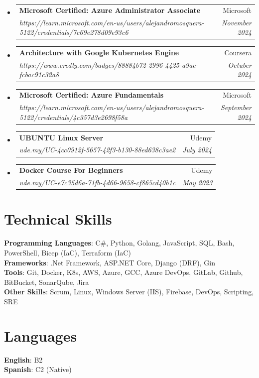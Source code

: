 \documentclass[letterpaper,11pt]{article}
\makeatletter
\newcommand{\resumeSubheading}[4]{
  \vspace{-2pt}\item
    \begin{tabular*}{0.97\textwidth}[t]{l@{\extracolsep{\fill}}r}
      \textbf{#1} & #2 \\
      \textit{\small#3} & \textit{\small #4} \\
    \end{tabular*}\vspace{-7pt}
}
\newcommand{\resumeSubHeadingListStart}{\begin{itemize}[leftmargin=0.15in, label={}]}
\newcommand{\resumeSubHeadingListEnd}{\end{itemize}}
\makeatother
\begin{document}
  \resumeSubHeadingListStart
    \resumeSubheading
      {Microsoft Certified: Azure Administrator Associate}{Microsoft}
      {https://learn.microsoft.com/en-us/users/alejandromosquera-5122/credentials/7c69e278d09e93c6}{November 2024}
  \resumeSubHeadingListEnd
  
  \resumeSubHeadingListStart
    \resumeSubheading
      {Architecture with Google Kubernetes Engine}{Coursera}
      {https://www.credly.com/badges/88884b72-2996-4425-a9ae-fcbac91c32a8}{Octuber 2024}
  \resumeSubHeadingListEnd

  \resumeSubHeadingListStart
    \resumeSubheading
      {Microsoft Certified: Azure Fundamentals}{Microsoft}
      {https://learn.microsoft.com/en-us/users/alejandromosquera-5122/credentials/4c357d3e2698f58a}{September 2024}
  \resumeSubHeadingListEnd
  
  \resumeSubHeadingListStart
    \resumeSubheading
      {UBUNTU Linux Server}{Udemy}
      {ude.my/UC-4cc0912f-5657-42f3-b130-88ed638c3ae2}{July 2024}
  \resumeSubHeadingListEnd

  \resumeSubHeadingListStart
    \resumeSubheading
      {Docker Course For Beginners}{Udemy}
      {ude.my/UC-e7c35d6a-71fb-4d66-9658-cf865cd40b1c}{May 2023}
  \resumeSubHeadingListEnd



%

\section{Technical Skills}
 \begin{itemize}[leftmargin=0.15in, label={}]
    \small{\item{
     \textbf{Programming Languages}{: C\#, Python, Golang, JavaScript, SQL, Bash, PowerShell, Bicep (IaC), Terraform (IaC)} \\
     \textbf{Frameworks}{: .Net Framework, ASP.NET Core, Django (DRF), Gin} \\
     \textbf{Tools}{: Git, Docker, K8s, AWS, Azure, GCC, Azure DevOps, GitLab, Github, BitBucket, SonarQube, Jira} \\
     \textbf{Other Skills}{: Scrum, Linux, Windows Server (IIS), Firebase, DevOps, Scripting, SRE}
    }}
 \end{itemize}

\section{Languages}
 \begin{itemize}[leftmargin=0.15in, label={}]
    \small{\item{
     \textbf{English}{: B2} \\
     \textbf{Spanish}{: C2 (Native)} \\
    }}
 \end{itemize}

\end{document}

